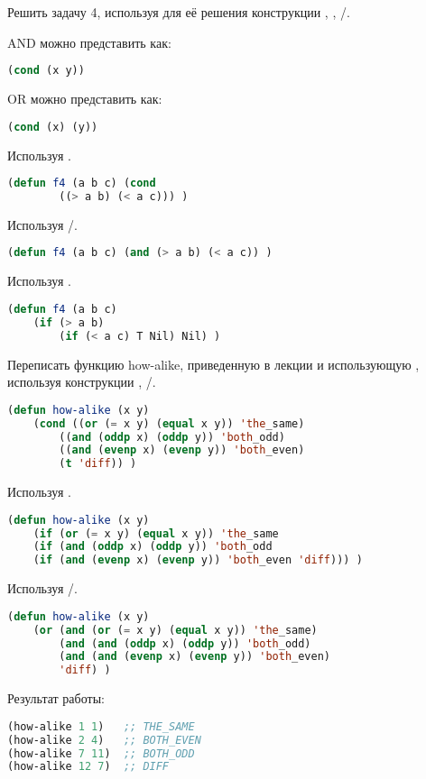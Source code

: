 \documentclass[a4paper,oneside,12pt]{extreport}
\begin{document}
\begin{task}
	Решить задачу 4, используя для её решения конструкции , , /.

	AND можно представить как:
	\begin{lstlisting}[language=Lisp]
	(cond (x y))
	\end{lstlisting}

	OR можно представить как:
	\begin{lstlisting}[language=Lisp]
	(cond (x) (y))
	\end{lstlisting}
	
	Используя .	
	\begin{lstlisting}[language=Lisp]
(defun f4 (a b c) (cond 
		((> a b) (< a c))) )
	\end{lstlisting}

	Используя /.	
	\begin{lstlisting}[language=Lisp]
(defun f4 (a b c) (and (> a b) (< a c)) )
	\end{lstlisting}

	Используя  .	
	\begin{lstlisting}[language=Lisp]
(defun f4 (a b c) 
	(if (> a b) 
		(if (< a c) T Nil) Nil) )
	\end{lstlisting}

\end{task}

\begin{task}
	Переписать функцию how-alike, приведенную в лекции и использующую , используя  конструкции , /.

	\begin{lstlisting}[language=Lisp]
(defun how-alike (x y)
	(cond ((or (= x y) (equal x y)) 'the_same)
		((and (oddp x) (oddp y)) 'both_odd)
		((and (evenp x) (evenp y)) 'both_even) 
		(t 'diff)) )
	\end{lstlisting}


	Используя  .	
	\begin{lstlisting}[language=Lisp]
(defun how-alike (x y)
	(if (or (= x y) (equal x y)) 'the_same
	(if (and (oddp x) (oddp y)) 'both_odd 
	(if (and (evenp x) (evenp y)) 'both_even 'diff))) )
	\end{lstlisting}


	Используя  /.	
	\begin{lstlisting}[language=Lisp]
(defun how-alike (x y)
	(or (and (or (= x y) (equal x y)) 'the_same)
		(and (and (oddp x) (oddp y)) 'both_odd)
		(and (and (evenp x) (evenp y)) 'both_even)
		'diff) )
	\end{lstlisting}

	Результат работы:

	\begin{lstlisting}[language=Lisp]
(how-alike 1 1)   ;; THE_SAME
(how-alike 2 4)   ;; BOTH_EVEN
(how-alike 7 11)  ;; BOTH_ODD
(how-alike 12 7)  ;; DIFF
	\end{lstlisting}

\end{task}
\end{document}
